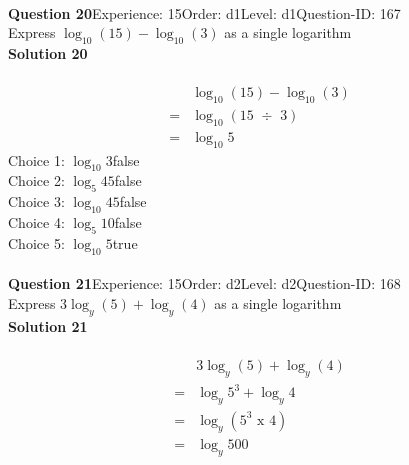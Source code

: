 \documentclass{article}
\begin{document}
\\[4pt]
\noindent\textbf{Question 20}\hspace{20pt}Experience: 15\hspace{20pt}Order: d1\hspace{20pt}Level: d1\hspace{20pt}Question-ID: 167\\[2pt]
Express $\log_{10}(15)-\log_{10}(3)$ as a single logarithm\\[4pt]
\noindent\textbf{Solution 20}\\[2pt]
\\[-35pt]\begin{align*}
&\log_{10}(15)-\log_{10}(3)\\[2pt]
=&\log_{10}(15 \,\, \div \,\, 3)\\[2pt]
=&\log_{10}5
\end{align*}
Choice 1: \hspace{20pt}$\log_{10}3$\hspace{20pt}false\\
Choice 2: \hspace{20pt}$\log_{5}45$\hspace{20pt}false\\
Choice 3: \hspace{20pt}$\log_{10}45$\hspace{20pt}false\\
Choice 4: \hspace{20pt}$\log_{5}10$\hspace{20pt}false\\
Choice 5: \hspace{20pt}$\log_{10}5$\hspace{20pt}true\\
\\[4pt]
\noindent\textbf{Question 21}\hspace{20pt}Experience: 15\hspace{20pt}Order: d2\hspace{20pt}Level: d2\hspace{20pt}Question-ID: 168\\[2pt]
Express $3\log_{y}(5)+\log_{y}(4)$ as a single logarithm\\[4pt]
\noindent\textbf{Solution 21}\\[2pt]
\\[-35pt]\begin{align*}
&3\log_{y}(5)+\log_{y}(4)\\[2pt]
=&\log_{y}5^3+\log_{y}4\\[2pt]
=&\log_{y}(5^3 \,\, \text{x} \,\, 4)\\[2pt]
=&\log_{y}500
\end{align*}
\end{document}
